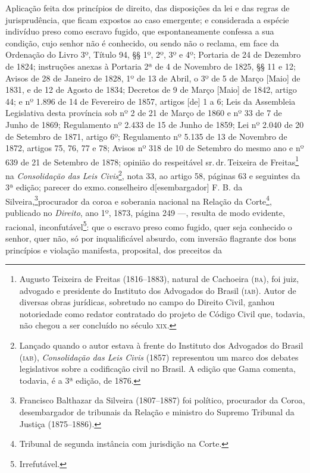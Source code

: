 Aplicação feita dos princípios de direito, das disposições da lei e das
regras de jurisprudência, que ficam expostos ao caso emergente; e
considerada a espécie indivíduo preso como escravo fugido, que
espontaneamente confessa a sua condição, cujo senhor não é conhecido, ou
sendo não o reclama, em face da Ordenação do Livro 3º, Título 94, §§ 1º,
2º, 3º e 4º; Portaria de 24 de Dezembro de 1824; instruções anexas à
Portaria 2ª de 4 de Novembro de 1825, §§ 11 e 12; Avisos de 28 de
Janeiro de 1828, 1º de 13 de Abril, o 3º de 5 de Março {[}Maio{]} de
1831, e de 12 de Agosto de 1834; Decretos de 9 de Março {[}Maio{]} de
1842, artigo 44; e nº 1.896 de 14 de Fevereiro de 1857, artigos {[}de{]}
1 a 6; Leis da Assembleia Legislativa desta província sob nº 2 de 21 de
Março de 1860 e nº 33 de 7 de Junho de 1869; Regulamento nº 2.433 de 15
de Junho de 1859; Lei nº 2.040 de 20 de Setembro de 1871, artigo 6º;
Regulamento nº 5.135 de 13 de Novembro de 1872, artigos 75, 76, 77 e 78;
Avisos nº 318 de 10 de Setembro do mesmo ano e nº 639 de 21 de Setembro
de 1878; opinião do respeitável sr.\,dr.\,Teixeira de Freitas\footnote{
  Augusto Teixeira de Freitas (1816--1883), natural de Cachoeira (\textsc{ba}),
  foi juiz, advogado e presidente do Instituto dos Advogados do Brasil
  (\textsc{iab}). Autor de diversas obras jurídicas, sobretudo no campo do
  Direito Civil, ganhou notoriedade como redator contratado do projeto
  de Código Civil que, todavia, não chegou a ser concluído no século \textsc{xix}.}
na \emph{Consolidação das Leis Civis}\footnote{Lançado quando o autor
  estava à frente do Instituto dos Advogados do Brasil (\textsc{iab}),
  \emph{Consolidação das Leis Civis} (1857) representou um marco dos
  debates legislativos sobre a codificação civil no Brasil. A edição que
  Gama comenta, todavia, é a 3ª edição, de 1876.}, nota 33, ao artigo
58, páginas 63 e seguintes da 3ª edição; parecer do exmo.\,conselheiro
d{[}esembargador{]} F. B. da Silveira,\footnote{Francisco Balthazar
  da Silveira (1807--1887) foi político, procurador da Coroa,
  desembargador de tribunais da Relação e ministro do Supremo Tribunal
  da Justiça (1875--1886).}procurador da coroa e soberania nacional na
Relação da Corte\footnote{Tribunal de segunda instância com jurisdição
  na Corte.}, publicado no \emph{Direito}, ano 1º, 1873, página 249
---, resulta de modo evidente, racional, inconfutável\footnote{
  Irrefutável.}: que o escravo preso como fugido, quer seja conhecido o
senhor, quer não, só por inqualificável absurdo, com inversão flagrante
dos bons princípios e violação manifesta, proposital, dos preceitos da
